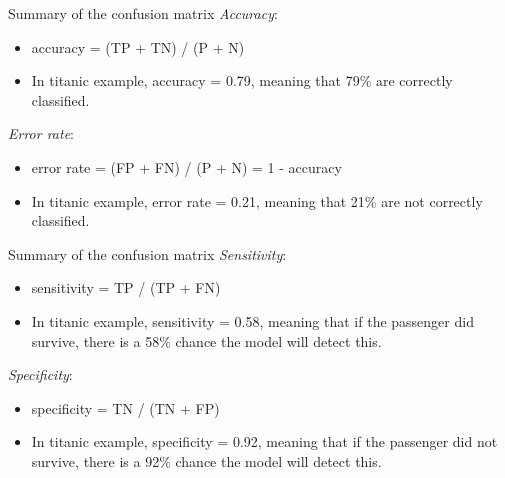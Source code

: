 \documentclass[10pt]{beamer}\usepackage[]{graphicx}\usepackage[]{xcolor}
\makeatletter
\newcommand{\hlopt}[1]{\textcolor[rgb]{0,0,0}{#1}}%
\newcommand{\hlstd}[1]{\textcolor[rgb]{0,0,0}{#1}}%
\newenvironment{kframe}{%
 \def\at@end@of@kframe{}%
 \ifinner\ifhmode%
  \def\at@end@of@kframe{\end{minipage}}%
  \begin{minipage}{\columnwidth}%
 \fi\fi%
 \def\FrameCommand##1{\hskip\@totalleftmargin \hskip-\fboxsep
 \colorbox{shadecolor}{##1}\hskip-\fboxsep
     \hskip-\linewidth \hskip-\@totalleftmargin \hskip\columnwidth}%
 \MakeFramed {\advance\hsize-\width
   \@totalleftmargin\z@ \linewidth\hsize
   \@setminipage}}%
 {\par\unskip\endMakeFramed%
 \at@end@of@kframe}
\newenvironment{knitrout}{}{} %
\makeatother
\begin{document}


\begin{frame}[fragile]{Summary of the confusion matrix}
\emph{Accuracy}:
\begin{itemize}
\item accuracy = (TP + TN) / (P + N)
\item In titanic example, accuracy = 0.79, meaning that 79\% are correctly classified.
\end{itemize}
\va
\emph{Error rate}:
\begin{itemize}
\item error rate = (FP + FN) / (P + N) = 1 - accuracy
\item In titanic example, error rate = 0.21, meaning that 21\% are not correctly classified.
\end{itemize}
\end{frame}


\begin{frame}[fragile]{Summary of the confusion matrix}
\emph{Sensitivity}:
\begin{itemize}
\item sensitivity = TP / (TP + FN)
\item In titanic example, sensitivity = 0.58, meaning that if the passenger did survive, there is a 58\% chance the model will detect this.
\end{itemize}
\va
\emph{Specificity}:
\begin{itemize}
\item specificity = TN / (TN + FP)
\item In titanic example, specificity = 0.92, meaning that if the passenger did not survive, there is a 92\% chance the model will detect this. 
\end{itemize}

\end{frame}
\end{document}
